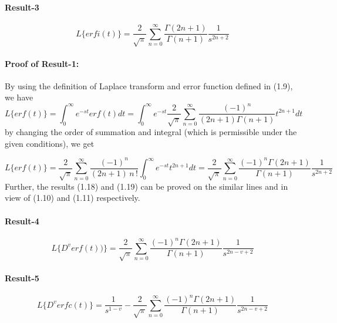 \documentclass[leqno]{article}
\begin{document}
\paragraph{Result-3}
\begin{equation}
    L \big\{ erfi(t) \big\} = 
    \frac{2}{\sqrt{\pi}}
    \sum_{n = 0}^{\infty}
    \frac{\Gamma{(2n+1)}}{\Gamma{(n+1)}}
    \frac{1}{s^{2n+2}}
\end{equation}
\paragraph{Proof of Result-1:}
By using the definition of Laplace transform and error function defined in (1.9), we have
\begin{equation*}
    L \big\{ erf(t) \big\}=
    \int_0^{\infty}
    {e^{-st}}erf(t)dt = 
    \int_0^{\infty}
    {e^{-st}}
    \frac{2}{\sqrt{\pi}}
    \sum_{n = 0}^{\infty}
    \frac{{(-1)}^n}{(2n+1)\Gamma{(n+1)}}
    t^{2n+1}dt
\end{equation*}
by changing the order of summation and integral (which is permissible under the given conditions), we get

\begin{equation*}
    L \big\{ erf(t) \big\}=
    \frac{2}{\sqrt{\pi}}
    \sum_{n = 0}^{\infty}
    \frac{{(-1)}^n}{(2n+1)\,n\,!}
    \int_0^{\infty}
    e^{-st}t^{2n+1}dt=
    \frac{2}{\sqrt{\pi}}
    \sum_{n = 0}^{\infty}
    \frac{{(-1)}^n\Gamma{(2n+1)}}{\Gamma{(n+1)}}
    \frac{1}{s^{2n+2}}
\end{equation*}
Further, the results (1.18) and (1.19) can be proved on the similar lines and in view of (1.10) and (1.11) respectively.\\ 
\paragraph{Result-4}
\begin{equation}
    L\big\{{D^v}erf(t))\big\} = 
    \frac{2}{\sqrt{\pi}}
    \sum_{n = 0}^{\infty}
    \frac{{(-1)}^n\Gamma{(2n+1)}}{\Gamma{(n+1)}}
    \frac{1}{s^{2n-v+2}}
\end{equation}
\paragraph{Result-5}
\begin{equation}
    L \big\{ D^v erfc(t) \big\} = 
    \frac{1}{s^{1-v}}-
    \frac{2}{\sqrt{\pi}}
    \sum_{n = 0}^{\infty}
    \frac{{(-1)}^n\Gamma{(2n+1)}}{\Gamma{(n+1)}}
    \frac{1}{s^{2n-v+2}}
\end{equation}
\end{document}

